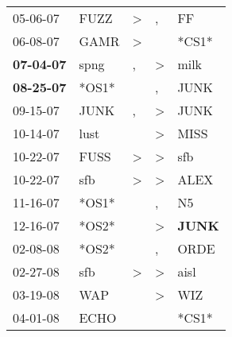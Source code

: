 \begin{supertabular}{p{0.07\textwidth}p{0.06\textwidth}p{0.02\textwidth}p{0.02\textwidth}p{0.06\textwidth}}
          05-06-07\textsuperscript{} &           FUZZ\textsuperscript{} &     \textgreater &                , &             FF\textsuperscript{} \\
          06-08-07\textsuperscript{} &           GAMR\textsuperscript{} &     \textgreater &                  &                            *CS1* \\
 \textbf{07-04-07\textsuperscript{}} &           spng\textsuperscript{} &                , &     \textgreater &           milk\textsuperscript{} \\
 \textbf{08-25-07\textsuperscript{}} &                            *OS1* &                  &                , &           JUNK\textsuperscript{} \\
          09-15-07\textsuperscript{} &           JUNK\textsuperscript{} &                , &     \textgreater &           JUNK\textsuperscript{} \\
          10-14-07\textsuperscript{} &           lust\textsuperscript{} &                  &     \textgreater &           MISS\textsuperscript{} \\
          10-22-07\textsuperscript{} &           FUSS\textsuperscript{} &     \textgreater &     \textgreater &            sfb\textsuperscript{} \\
          10-22-07\textsuperscript{} &            sfb\textsuperscript{} &     \textgreater &     \textgreater &           ALEX\textsuperscript{} \\
          11-16-07\textsuperscript{} &                            *OS1* &                  &                , &             N5\textsuperscript{} \\
          12-16-07\textsuperscript{} &                            *OS2* &                  &     \textgreater &  \textbf{JUNK\textsuperscript{}} \\
          02-08-08\textsuperscript{} &                            *OS2* &                  &                , &           ORDE\textsuperscript{} \\
          02-27-08\textsuperscript{} &            sfb\textsuperscript{} &     \textgreater &     \textgreater &           aisl\textsuperscript{} \\
          03-19-08\textsuperscript{} &            WAP\textsuperscript{} &                  &     \textgreater &            WIZ\textsuperscript{} \\
          04-01-08\textsuperscript{} &           ECHO\textsuperscript{} &                  &                  &                            *CS1* \\

\end{supertabular}
